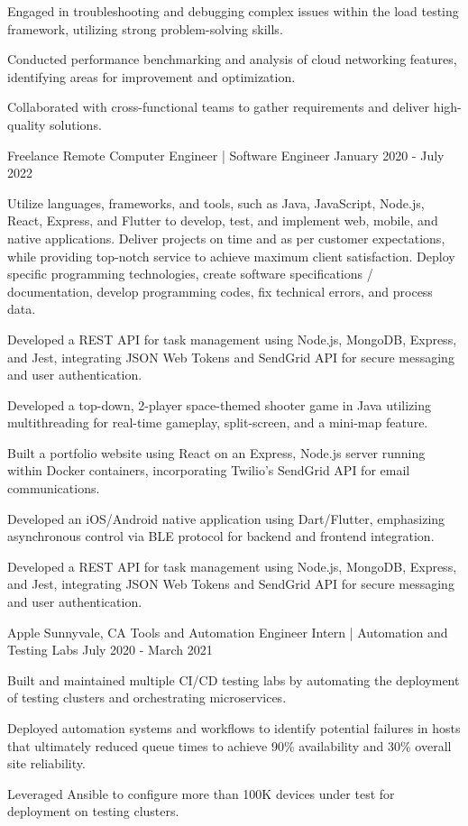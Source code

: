 \documentclass{resume}
\begin{document}
{{        \item Engaged in troubleshooting and debugging complex issues within the load testing framework, utilizing strong problem-solving skills.
        \item Conducted performance benchmarking and analysis of cloud networking features, identifying areas for improvement and optimization.
        \item Collaborated with cross-functional teams to gather requirements and deliver high-quality solutions.
        \vspace{0.5em}%
    }
    \expdivider
    \experienceItem
    {Freelance}
    {Remote}
    {Computer Engineer | Software Engineer}
    {January 2020 - July 2022}
    {%
        \item Utilize languages, frameworks, and tools, such as Java, JavaScript, Node.js, React, Express, and Flutter to develop, test, and implement web, mobile, and native applications. Deliver projects on time and as per customer expectations, while providing top-notch service to achieve maximum client satisfaction. Deploy specific programming technologies, create software specifications / documentation, develop programming codes, fix technical errors, and process data.
        \item Developed a REST API for task management using Node.js, MongoDB, Express, and Jest, integrating JSON Web Tokens and SendGrid API for secure messaging and user authentication.
        \item Developed a top-down, 2-player space-themed shooter game in Java utilizing multithreading for real-time gameplay, split-screen, and a mini-map feature.
        \item Built a portfolio website using React on an Express, Node.js server running within Docker containers, incorporating Twilio’s SendGrid API for email communications.
        \item Developed an iOS/Android native application using Dart/Flutter, emphasizing asynchronous control via BLE protocol for backend and frontend integration.
        \item Developed a REST API for task management using Node.js, MongoDB, Express, and Jest, integrating JSON Web Tokens and SendGrid API for secure messaging and user authentication.
    }
    \expdivider
    \experienceItem
    {Apple}
    {Sunnyvale, CA}
    {Tools and Automation Engineer Intern | Automation and Testing Labs}
    {July 2020 - March 2021}
    {%
        \item Built and maintained multiple CI/CD testing labs by automating the deployment of testing clusters and orchestrating microservices.
        \item Deployed automation systems and workflows to identify potential failures in hosts that ultimately reduced queue times to achieve 90\% availability and 30\% overall site reliability.
        \item Leveraged Ansible to configure more than 100K devices under test for deployment on testing clusters.
    }

}
\end{document}
